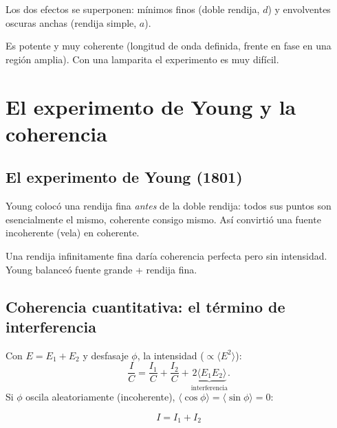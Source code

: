 \documentclass[12pt,a4paper]{article}
\begin{document}


Los dos efectos se superponen: mínimos finos (doble rendija, $d$) y envolventes
oscuras anchas (rendija simple, $a$).



\begin{notebox}
  Es potente y muy coherente (longitud de onda definida, frente en fase en una
  región amplia). Con una lamparita el experimento es muy difícil.
\end{notebox}

\section{El experimento de Young y la coherencia}

\subsection{El experimento de Young (1801)}

Young colocó una rendija fina \emph{antes} de la doble rendija: todos sus puntos
son esencialmente el mismo, coherente consigo mismo. Así convirtió una fuente
incoherente (vela) en coherente.

\begin{warnbox}[Compromiso]
  Una rendija infinitamente fina daría coherencia perfecta pero sin intensidad.
  Young balanceó fuente grande + rendija fina.
\end{warnbox}



\subsection{Coherencia cuantitativa: el término de interferencia}

Con $E = E_1 + E_2$ y desfasaje $\phi$, la intensidad ($\propto \langle
E^2\rangle$):
\[
\frac{I}{C} = \frac{I_1}{C} + \frac{I_2}{C} + \underbrace{2\langle E_1
E_2\rangle}_{\text{interferencia}}.
\]
Si $\phi$ oscila aleatoriamente (incoherente), $\langle\cos\phi\rangle =
\langle\sin\phi\rangle = 0$:

\begin{keybox}
  \[
  \boxed{I = I_1 + I_2}
  \]
\end{keybox}
\end{document}
